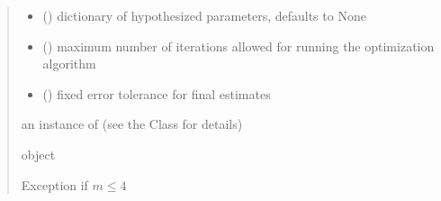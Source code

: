 \documentclass[letterpaper,10pt,english]{sphinxmanual}
\begin{document}
\begin{fulllineitems}
\begin{quote}
\begin{description}
\begin{itemize}
\item {} 
\sphinxAtStartPar
{} (\sphinxstyleliteralemphasis{\sphinxupquote{, }}) \textendash{} dictionary of hypothesized parameters, defaults to None

\item {} 
\sphinxAtStartPar
{} () \textendash{} maximum number of iterations allowed for running the optimization algorithm

\item {} 
\sphinxAtStartPar
{} () \textendash{} fixed error tolerance for final estimates

\end{itemize}

\sphinxAtStartPar
an instance of  (see the Class for details)

\sphinxAtStartPar
object

\sphinxAtStartPar
Exception if \(m \leq 4\)

\end{description}\end{quote}

\end{fulllineitems}

\end{document}
